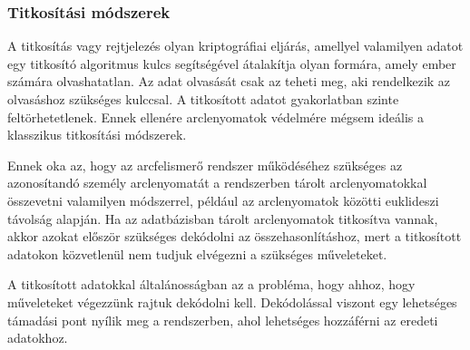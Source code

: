 
\subsubsection{Titkosítási módszerek} %




A titkosítás vagy rejtjelezés olyan kriptográfiai eljárás, amellyel valamilyen adatot egy titkosító algoritmus kulcs segítségével átalakítja olyan formára, amely ember számára olvashatatlan. Az adat olvasását csak az teheti meg, aki rendelkezik az olvasáshoz szükséges kulccsal. A titkosított adatot gyakorlatban szinte feltörhetetlenek. Ennek ellenére arclenyomatok védelmére mégsem ideális a klasszikus titkosítási módszerek. 

Ennek oka az, hogy az arcfelismerő rendszer működéséhez szükséges az azonosítandó személy arclenyomatát a rendszerben tárolt arclenyomatokkal összevetni valamilyen módszerrel, például az arclenyomatok közötti euklideszi távolság alapján. Ha az adatbázisban tárolt arclenyomatok titkosítva vannak, akkor azokat először szükséges dekódolni az összehasonlításhoz, mert a titkosított adatokon közvetlenül nem tudjuk elvégezni a szükséges műveleteket. 

A titkosított adatokkal általánosságban az a probléma, hogy ahhoz, hogy műveleteket végezzünk rajtuk dekódolni kell. Dekódolással viszont egy lehetséges támadási pont nyílik meg a rendszerben, ahol lehetséges hozzáférni az eredeti adatokhoz.

